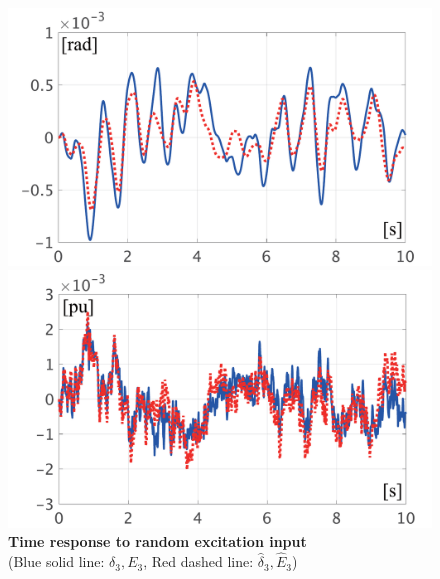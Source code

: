 \documentclass[graybox, envcountchap]{svmult}
\begin{document}
\begin{figure}[t]
  \centering
  {
  \begin{minipage}{0.49\linewidth}
    \centering
    \includegraphics[width = 1.0\linewidth]{figs/timedeltamodel}
     \medskip
  \end{minipage}
  \begin{minipage}{0.49\linewidth}
    \centering
    \includegraphics[width = 1.0\linewidth]{figs/timeEmodel}
     \medskip
  \end{minipage}
    }
\caption{\textbf{Time response to random excitation input}
 \\ \centering(Blue solid line: $\delta_3, E_3$, Red dashed line: $\hat{\delta}_3,\hat{E}_3$)
 }
  \label{fig:timeVmodel}
\medskip
\end{figure}
\end{document}
